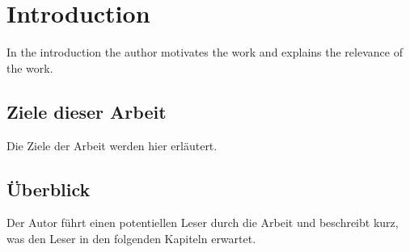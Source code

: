 \chapter{Introduction}
In the introduction the author motivates the work and explains the relevance of the work.

\section{Ziele dieser Arbeit}
Die Ziele der Arbeit werden hier erläutert. 

\section{Überblick}
Der Autor führt einen potentiellen Leser durch die Arbeit und beschreibt kurz, was den Leser in den folgenden Kapiteln erwartet.



